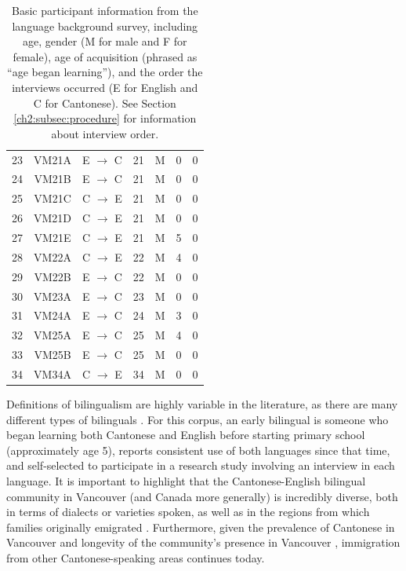 \begin{table}[!htbp]
\begin{center}
\begin{tabular}{ccccccc}
  23  & VM21A & E $\rightarrow$ C & 21  & M & 0   & 0 \\
  24  & VM21B & E $\rightarrow$ C & 21  & M & 0   & 0 \\
  25  & VM21C & C $\rightarrow$ E & 21  & M & 0   & 0 \\
  26  & VM21D & C $\rightarrow$ E & 21  & M & 0   & 0 \\
  27  & VM21E & C $\rightarrow$ E & 21  & M & 5   & 0 \\
  28  & VM22A & C $\rightarrow$ E & 22  & M & 4   & 0 \\
  29  & VM22B & E $\rightarrow$ C & 22  & M & 0   & 0 \\
  30  & VM23A & E $\rightarrow$ C & 23  & M & 0   & 0 \\
  31  & VM24A & E $\rightarrow$ C & 24  & M & 3   & 0 \\
  32  & VM25A & E $\rightarrow$ C & 25  & M & 4   & 0 \\
  33  & VM25B & E $\rightarrow$ C & 25  & M & 0   & 0 \\
  34  & VM34A & C $\rightarrow$ E & 34  & M & 0   & 0 \\
  \bottomrule
  
  \end{tabular}
  \caption{Basic participant information from the language background survey, including age, gender (M for male and F for female), age of acquisition (phrased as ``age began learning''), and the order the interviews occurred (E for English and C for Cantonese). See Section \ref{ch2:subsec:procedure} for information about interview order.}
  \label{ch2:tab:participants}
  \end{center}
  \end{table}

Definitions of bilingualism are highly variable in the literature, as there are many different types of bilinguals \citep{amengual_2017_type}. For this corpus, an early bilingual is someone who began learning both Cantonese and English before starting primary school (approximately age 5), reports consistent use of both languages since that time, and self-selected to participate in a research study involving an interview in each language. It is important to highlight that the Cantonese-English bilingual community in Vancouver (and Canada more generally) is incredibly diverse, both in terms of dialects or varieties spoken, as well as in the regions from which families originally emigrated \citep{yu_2013_diaspora}. Furthermore, given the prevalence of Cantonese in Vancouver \citep{statistics_2017_proportion} and longevity of the community's presence in Vancouver \citep{yu_2013_diaspora}, immigration from other Cantonese-speaking areas continues today. 

